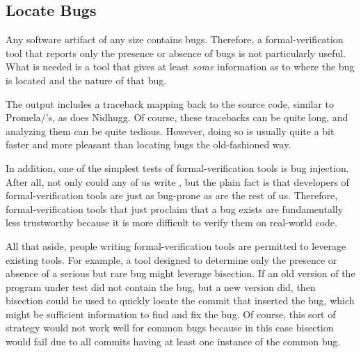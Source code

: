 \iffalse

It would of course be quite useful for tools to automatically divide
up large programs, verify the pieces, and then verify the combinations
of pieces.
In the meantime, verification of large programs will require significant
manual intervention.
This intervention will preferably mediated by scripting, the better to
reliably carry out repeated verifications on each release, and
preferably eventually in a manner well-suited for continuous integration.
And Facebook's Infer tool has taken important steps towards doing just
that, via compositionality and
abstraction~\cite{SamBlackshear2018RacerD,DinoDistefano2019FBstaticAnalysis}.

In any case, we can expect formal-verification capabilities to continue
to increase over time, and any such increases will in turn increase
the applicability of formal verification to regression testing.

\fi

\subsection{Locate Bugs}
\label{sec:future:Locate Bugs}

Any software artifact of any size contains bugs.
Therefore, a formal-verification tool that reports only the
presence or absence of bugs is not particularly useful.
What is needed is a tool that gives at least \emph{some} information
as to where the bug is located and the nature of that bug.

The  output includes a traceback mapping back to the source
code, similar to Promela/'s, as does Nidhugg.
Of course, these tracebacks can be quite long, and analyzing them
can be quite tedious.
However, doing so is usually quite a bit faster
and more pleasant than locating bugs the old-fashioned way.

In addition, one of the simplest tests of formal-verification tools is
bug injection.
After all, not only could any of us write
, but the plain fact is that
developers of formal-verification tools are just as bug-prone as
are the rest of us.
Therefore, formal-verification tools that just proclaim that a
bug exists are fundamentally less trustworthy because it is
more difficult to verify them on real-world code.

All that aside, people writing formal-verification tools are
permitted to leverage existing tools.
For example, a tool designed to determine only the presence
or absence of a serious but rare bug might leverage bisection.
If an old version of the program under test did not contain the bug,
but a new version did, then bisection could be used to quickly
locate the commit that inserted the bug, which might be
sufficient information to find and fix the bug.
Of course, this sort of strategy would not work well for common
bugs because in this case bisection would fail due to all commits
having at least one instance of the common bug.

